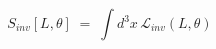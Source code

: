 \begin{equation}\label{eq:defseuc}
S_{inv}[L,\theta] \;=\; \int d^3x \,{\mathcal L}_{inv} (L,\theta)
\end{equation}

